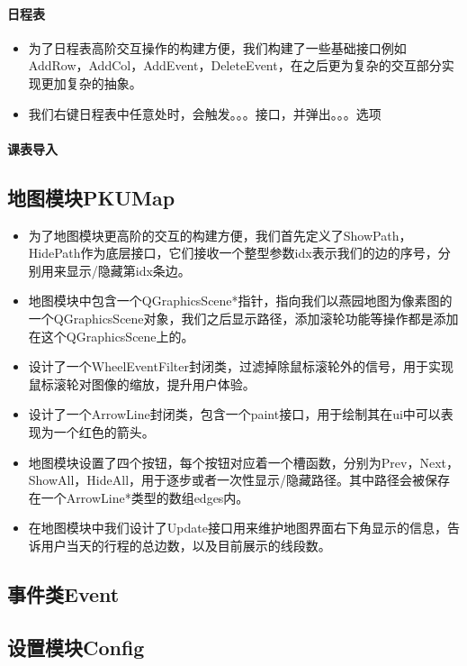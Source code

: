 \documentclass[11pt,hyperref,a4paper,UTF8]{ctexart}
\begin{document}
\begin{CJK}{UTF8}{gkai}
\paragraph{ 日程表}
\begin{itemize}
    \item 为了日程表高阶交互操作的构建方便，我们构建了一些基础接口例如AddRow，AddCol，AddEvent，DeleteEvent，在之后更为复杂的交互部分实现更加复杂的抽象。
    \item 我们右键日程表中任意处时，会触发。。。接口，并弹出。。。选项
\end{itemize}

\paragraph{ 课表导入}


\subsection{ 地图模块PKUMap}
\begin{itemize}
    \item 为了地图模块更高阶的交互的构建方便，我们首先定义了ShowPath，HidePath作为底层接口，它们接收一个整型参数idx表示我们的边的序号，分别用来显示/隐藏第idx条边。
    \item 地图模块中包含一个QGraphicsScene*指针，指向我们以燕园地图为像素图的一个QGraphicsScene对象，我们之后显示路径，添加滚轮功能等操作都是添加在这个QGraphicsScene上的。
    \item 设计了一个WheelEventFilter封闭类，过滤掉除鼠标滚轮外的信号，用于实现鼠标滚轮对图像的缩放，提升用户体验。
    \item 设计了一个ArrowLine封闭类，包含一个paint接口，用于绘制其在ui中可以表现为一个红色的箭头。
    \item 地图模块设置了四个按钮，每个按钮对应着一个槽函数，分别为Prev，Next，ShowAll，HideAll，用于逐步或者一次性显示/隐藏路径。其中路径会被保存在一个ArrowLine*类型的数组edges内。
    \item 在地图模块中我们设计了Update接口用来维护地图界面右下角显示的信息，告诉用户当天的行程的总边数，以及目前展示的线段数。
\end{itemize}

\subsection{ 事件类Event}

\subsection{ 设置模块Config}


\end{CJK}
\end{document}
